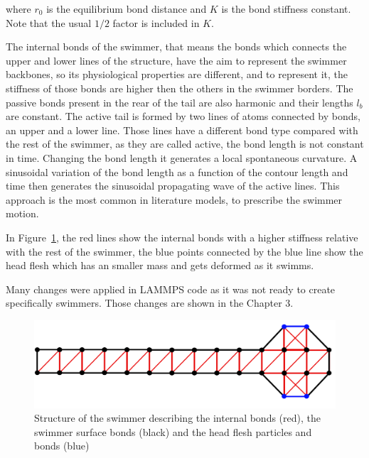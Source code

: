 where $r_{0}$ is the equilibrium bond distance and $K$ is the bond stiffness constant. Note that the usual $1/2$ factor is included in $K$.

The internal bonds of the swimmer, that means the bonds which connects the upper and lower lines of the structure, have the aim to represent the swimmer backbones, so its 
physiological properties are different, and to represent it, the stiffness of those bonds are higher then the others in the swimmer borders. The passive bonds present in the 
rear of the tail are also harmonic and their lengths $l_{b}$ are constant. The active tail is formed by two lines of atoms connected by bonds, an upper and a lower line. Those
lines have a different bond type compared with the rest of the swimmer, as they are called active, the bond length is not constant in time. Changing the bond length it generates
a local spontaneous curvature. A sinusoidal variation of the bond length as a function of the contour length and time then generates the sinusoidal propagating wave of the active
lines. This approach is the most common in literature models, to prescribe the swimmer motion.\par

In Figure~\ref{fig:Bild2.7}, the red lines show the internal bonds with a higher stiffness relative with the rest of the swimmer, the blue points connected by the blue line show the 
head flesh which has an smaller mass and gets deformed as it swimms.\par
Many changes were applied in LAMMPS code as it was not ready to create specifically swimmers. Those changes are shown in the Chapter 3.


\begin{figure}[ht]
\centering
  \begin{footnotesize}
  \includegraphics[scale=0.25]{images/swimmer-compare.png}
  \caption[Structure of the swimmer describing the internal bonds (red), the swimmer surface bonds (black) and the head flesh particles and bonds(blue)]{Structure of the swimmer describing the internal bonds (red), the swimmer surface bonds (black) and the head flesh particles and bonds (blue)}
  \label{fig:Bild2.7}
  \end{footnotesize}
\end{figure} 



